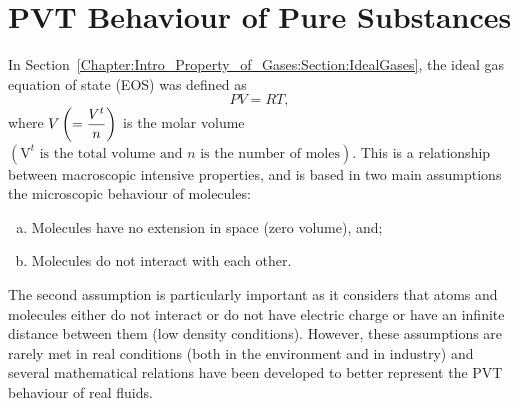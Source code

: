 \section{PVT Behaviour of Pure Substances}\label{Chapter:VolumetricPropertiesPureSubstances:Section:PVTBehaviour}
In Section~\ref{Chapter:Intro_Property_of_Gases:Section:IdealGases}, the ideal gas equation of state (EOS) was defined as 
     \begin{displaymath}
        PV = RT,
     \end{displaymath}
     where $V\left(=\displaystyle\frac{V^{t}}{n}\right)$ is the molar volume $\left(\text{V}^{t}\text{ is the total volume and } n \text{ is the number of moles}\right)$. This is a relationship between macroscopic intensive properties, and is based in two main assumptions \wrt the microscopic behaviour of molecules:
     \begin{enumerate}[(a)]
        \item Molecules have no extension in space (\ie zero volume), and;
        \item Molecules do not interact with each other.
     \end{enumerate}
     The second assumption is particularly important as it considers that atoms and molecules either do not interact or do not have electric charge or have an infinite distance between them (\ie low density conditions). However, these assumptions are rarely met in real conditions (both in the environment and in industry) and several mathematical relations have been developed to better represent the PVT behaviour of real fluids.

